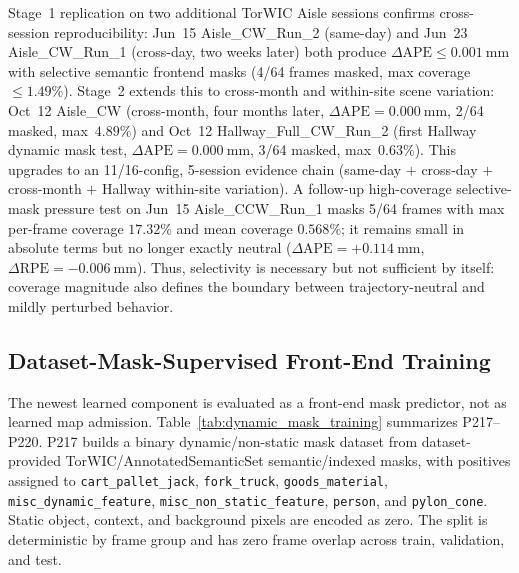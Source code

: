 \documentclass[journal]{IEEEtran}
\begin{document}
Stage~1 replication on two additional TorWIC Aisle sessions confirms cross-session reproducibility: Jun~15 Aisle\_CW\_Run\_2 (same-day) and Jun~23 Aisle\_CW\_Run\_1 (cross-day, two weeks later) both produce $\Delta\text{APE} \leq 0.001~\text{mm}$ with selective semantic frontend masks (4/64 frames masked, max coverage $\leq 1.49\%$). Stage~2 extends this to cross-month and within-site scene variation: Oct~12 Aisle\_CW (cross-month, four months later, $\Delta\text{APE}=0.000~\text{mm}$, 2/64 masked, max~$4.89\%$) and Oct~12 Hallway\_Full\_CW\_Run\_2 (first Hallway dynamic mask test, $\Delta\text{APE}=0.000~\text{mm}$, 3/64 masked, max~$0.63\%$). This upgrades to an 11/16-config, 5-session evidence chain (same-day $+$ cross-day $+$ cross-month $+$ Hallway within-site variation). A follow-up high-coverage selective-mask pressure test on Jun~15 Aisle\_CCW\_Run\_1 masks 5/64 frames with max per-frame coverage $17.32\%$ and mean coverage $0.568\%$; it remains small in absolute terms but no longer exactly neutral ($\Delta\text{APE}=+0.114~\text{mm}$, $\Delta\text{RPE}=-0.006~\text{mm}$). Thus, selectivity is necessary but not sufficient by itself: coverage magnitude also defines the boundary between trajectory-neutral and mildly perturbed behavior.

\subsection{Dataset-Mask-Supervised Front-End Training}
\label{sec:results_dynamic_mask_training}

The newest learned component is evaluated as a front-end mask predictor, not as learned map admission. Table~\ref{tab:dynamic_mask_training} summarizes P217--P220. P217 builds a binary dynamic/non-static mask dataset from dataset-provided TorWIC/AnnotatedSemanticSet semantic/indexed masks, with positives assigned to \texttt{cart\_pallet\_jack}, \texttt{fork\_truck}, \texttt{goods\_material}, \texttt{misc\_dynamic\_feature}, \texttt{misc\_non\_static\_feature}, \texttt{person}, and \texttt{pylon\_cone}. Static object, context, and background pixels are encoded as zero. The split is deterministic by frame group and has zero frame overlap across train, validation, and test.
\end{document}
